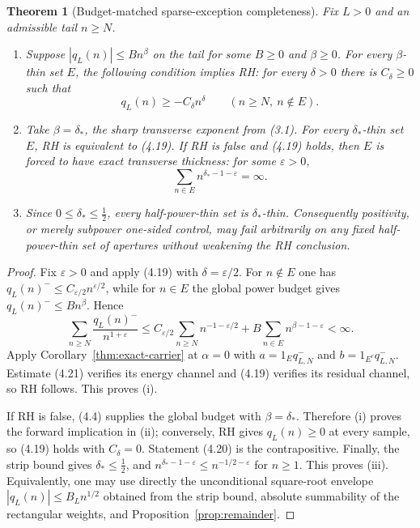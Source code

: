 \documentclass[11pt]{article}
\newtheorem{theorem}{Theorem}[section]
\begin{document}
\begin{theorem}[Budget-matched sparse-exception completeness]
\label{thm:sparse-exception}
Fix $L>0$ and an admissible tail $n\ge N$.

\begin{enumerate}[label=\textup{(\roman*)}]
\item Suppose $|q_L(n)|\le Bn^\beta$ on the tail for some $B\ge0$ and $\beta\ge0$.
For every $\beta$-thin set $E$, the following condition implies RH: for every $\delta>0$ there
is $C_\delta\ge0$ such that
\[
  q_L(n)\ge-C_\delta n^\delta
  \qquad(n\ge N,\ n\notin E).
  \tag{4.19}
\]
\item Take $\beta=\delta_*$, the sharp transverse exponent from \textup{(3.1)}.  For every
$\delta_*$-thin set $E$, RH is equivalent to \textup{(4.19)}.  If RH is false and
\textup{(4.19)} holds, then $E$ is forced to have exact transverse thickness: for some
$\varepsilon>0$,
\[
  \sum_{n\in E}n^{\delta_*-1-\varepsilon}=\infty.
  \tag{4.20}
\]
\item Since $0\le\delta_*\le\frac12$, every half-power-thin set is $\delta_*$-thin.
Consequently positivity, or merely subpower one-sided control, may fail arbitrarily on any fixed
half-power-thin set of apertures without weakening the RH conclusion.
\end{enumerate}
\end{theorem}

\begin{proof}
Fix $\varepsilon>0$ and apply (4.19) with
$\delta=\varepsilon/2$.  For $n\notin E$ one has
$q_L(n)^-\le C_{\varepsilon/2}n^{\varepsilon/2}$, while for $n\in E$ the global power budget
gives $q_L(n)^-\le Bn^\beta$.  Hence
\[
 \sum_{n\ge N}\frac{q_L(n)^-}{n^{1+\varepsilon}}
 \le
 C_{\varepsilon/2}\sum_{n\ge N}n^{-1-\varepsilon/2}
 +B\sum_{n\in E}n^{\beta-1-\varepsilon}<\infty.
 \tag{4.21}
\]
Apply Corollary~\ref{thm:exact-carrier} at $\alpha=0$ with
$a=1_Eq_{L,N}^-$ and $b=1_{E^c}q_{L,N}^-$.  Estimate (4.21) verifies its energy channel and
\textup{(4.19)} verifies its residual channel, so RH follows.  This proves (i).

If RH is false, (4.4) supplies the global budget with $\beta=\delta_*$.  Therefore (i) proves the
forward implication in (ii); conversely, RH gives $q_L(n)\ge0$ at every sample, so (4.19) holds
with $C_\delta=0$.  Statement (4.20) is the contrapositive.  Finally, the strip bound gives
$\delta_*\le\frac12$, and $n^{\delta_*-1-\varepsilon}\le n^{-1/2-\varepsilon}$ for $n\ge1$.
This proves (iii).  Equivalently, one may use directly the unconditional square-root envelope
$|q_L(n)|\le B_Ln^{1/2}$ obtained from the strip bound, absolute summability of the rectangular
weights, and Proposition~\ref{prop:remainder}.
\end{proof}
\end{document}
